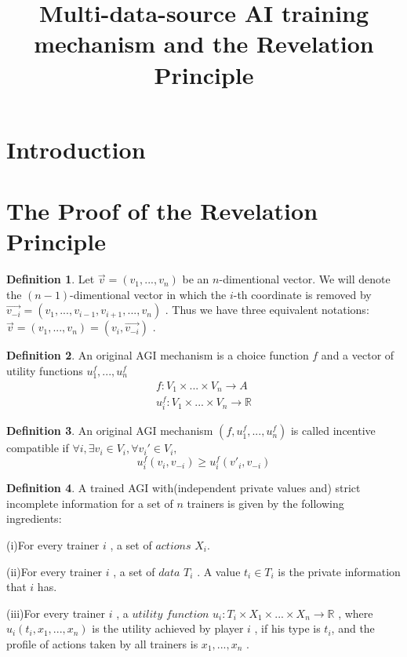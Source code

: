 \documentclass[10pt,reqno]{amsart}
\theoremstyle{definition}
\newtheorem{defn}{Definition}[section]
\theoremstyle{remark}
\numberwithin{equation}{section}
\begin{document}
\title[Multi-data-source AI training mechanism and the Revelation Principle ]
{Multi-data-source AI training mechanism and the Revelation Principle }
\author{}
\address{}
\email{}
\begin{abstract}

\end{abstract}
\subjclass
\keywords
\maketitle

\section{Introduction}
\section{The Proof of the Revelation Principle}
\begin{defn}
Let $\vec{v}=(v_1,...,v_n)$ be an $n$-dimentional vector. We will denote the $(n-1)$-dimentional vector in which the $i$-th coordinate is removed by $\vec{v_{-i}}=(v_1,...,v_{i-1},v_{i+1},...,v_n)$ . Thus we have three equivalent notations:$\vec{v}=(v_1,...,v_n)=(v_i,\vec{v_{-i}})$ .
\end{defn}


\begin{defn}
An original AGI mechanism is a choice function $f$ and a vector of utility functions $u_1^f,...,u_n^f$
\begin{eqnarray}
f:V_1\times ... \times V_n \rightarrow A\\
u_i^f :V_1\times ... \times V_n \rightarrow \mathbb{R}
\end{eqnarray}
\end{defn}


\begin{defn}
An original AGI mechanism $(f,u_1^f,...,u_n^f) $ is called incentive compatible if $\forall i, \exists  v_i \in V_i, \forall v_i' \in V_i,  $  %
\begin{equation}
u_i^f(v_i,v_{-i} )\geq u_i^f(v'_i,v_{-i} )
\end{equation}
\end{defn}

\begin{defn}
A trained AGI with(independent private values and) strict incomplete information for a set of $n$ trainers is given by the following ingredients:

(i)For every trainer $i$ , a set of $actions$ $X_i$.

(ii)For every trainer $i$ , a set of $data$ $T_i$ . A value $t_i\in T_i$ is the private information that $i$ has.

(iii)For every trainer $i$ , a $utility$ $function$ $u_i: T_i \times X_1\times ...\times X_n\rightarrow \mathbb{R}$ , where $u_i(t_i,x_1,...,x_n)$ is the utility achieved by player $i$ , if his type is $t_i$, and the profile of actions taken by all trainers is $x_1,...,x_n$ . 
\end{defn}
\end{document}
